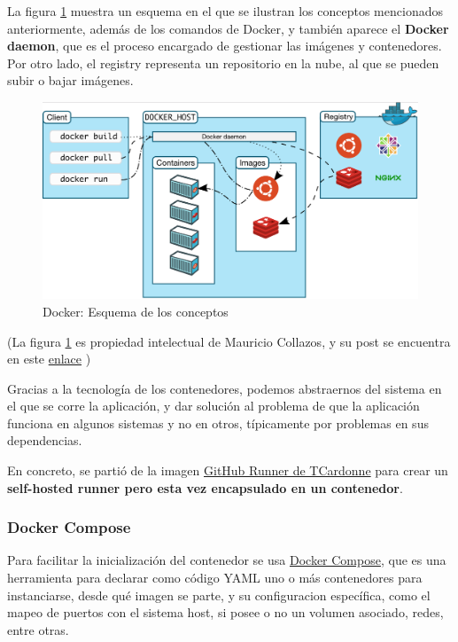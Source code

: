 La figura \ref{fig:docker} muestra un esquema en el que se ilustran los conceptos mencionados anteriormente, además de los comandos de Docker, y también aparece el \textbf{Docker daemon}, que es el proceso encargado de gestionar las imágenes y contenedores. Por otro lado, el registry representa un repositorio en la nube, al que se pueden subir o bajar imágenes.

\begin{figure}[H]
    \centering
    \includegraphics[width=1\textwidth]{fig/docker.png}
    \caption{Docker: Esquema de los conceptos}
    \label{fig:docker}
\end{figure}

(La figura \ref{fig:docker} es propiedad intelectual de Mauricio Collazos, y su post se encuentra en este \href{https://medium.com/ingenier%C3%ADa-en-tranqui-finanzas/una-gu%C3%ADa-no-tan-r%C3%A1pida-de-docker-y-kubernetes-933f5b6709df } {enlace} )

Gracias a la tecnología de los contenedores, podemos abstraernos del sistema en el  que se corre la aplicación, y dar solución al problema de que la aplicación funciona en algunos sistemas y no en otros, típicamente por problemas en sus dependencias.

En concreto, se partió de la imagen \href{https://registry.hub.docker.com/r/tcardonne/github-runner}{GitHub Runner de TCardonne} para crear un \textbf{self-hosted runner pero esta vez encapsulado en un contenedor}.

\subsubsection{Docker Compose}

Para facilitar la inicialización del contenedor se usa \href{https://docs.docker.com/compose/}{Docker Compose}, que es una herramienta para declarar como código YAML uno o más contenedores para instanciarse, desde qué imagen se parte, y su configuracion específica, como el mapeo de puertos con el sistema host, si posee o no un volumen asociado, redes, entre otras. 


